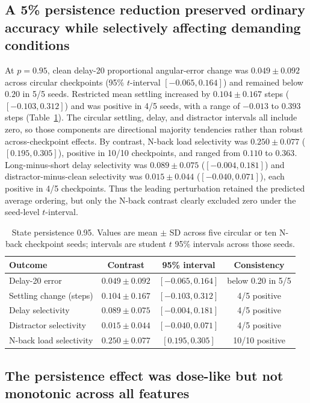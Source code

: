 \subsection{A 5\% persistence reduction preserved ordinary accuracy while
selectively affecting demanding conditions}

At $p=0.95$, clean delay-20 proportional angular-error change was
$0.049\pm0.092$ across circular checkpoints (95\% $t$-interval
$[-0.065,0.164]$) and remained below $0.20$ in 5/5 seeds. Restricted mean
settling increased by $0.104\pm0.167$ steps ($[-0.103,0.312]$) and was
positive in 4/5 seeds, with a range of $-0.013$ to $0.393$ steps
(Table~\ref{tab:leading}). The circular settling, delay, and distractor
intervals all include zero, so those components are directional majority
tendencies rather than robust across-checkpoint effects. By contrast, N-back
load selectivity was $0.250\pm0.077$ ($[0.195,0.305]$), positive in 10/10
checkpoints, and ranged from $0.110$ to $0.363$. Long-minus-short delay
selectivity was $0.089\pm0.075$ ($[-0.004,0.181]$) and distractor-minus-clean
selectivity was $0.015\pm0.044$ ($[-0.040,0.071]$), each positive in 4/5
checkpoints. Thus the leading perturbation retained the predicted average
ordering, but only the N-back contrast clearly excluded zero under the
seed-level $t$-interval.

\begin{table}[t]
\caption{State persistence 0.95. Values are mean $\pm$ SD across five
circular or ten N-back checkpoint seeds; intervals are student $t$ 95\%
intervals across those seeds.}
\label{tab:leading}
\centering
\begin{tabular}{lccc}
\toprule
Outcome & Contrast & 95\% interval & Consistency \\
\midrule
Delay-20 error & $0.049\pm0.092$ & $[-0.065,0.164]$ & below 0.20 in 5/5 \\
Settling change (steps) & $0.104\pm0.167$ & $[-0.103,0.312]$ & 4/5 positive \\
Delay selectivity & $0.089\pm0.075$ & $[-0.004,0.181]$ & 4/5 positive \\
Distractor selectivity & $0.015\pm0.044$ & $[-0.040,0.071]$ & 4/5 positive \\
N-back load selectivity & $0.250\pm0.077$ & $[0.195,0.305]$ & 10/10 positive \\
\bottomrule
\end{tabular}
\end{table}

\subsection{The persistence effect was dose-like but not monotonic across all
features}

